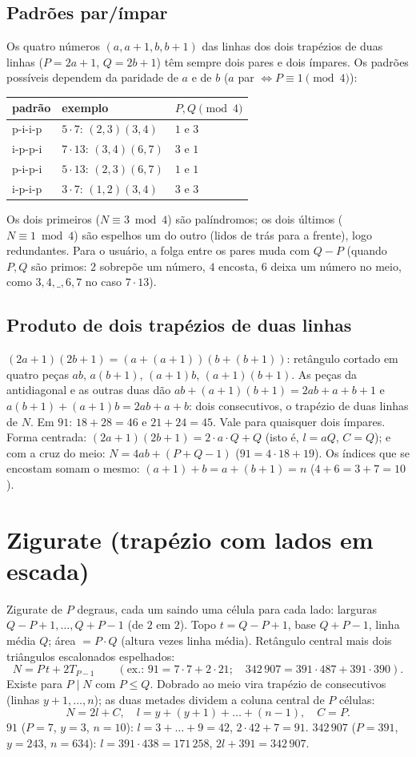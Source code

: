 \documentclass[11pt,a4paper]{article}
\begin{document}
\subsection{Padrões par/ímpar}
Os quatro números $(a,a+1,b,b+1)$ das linhas dos dois trapézios de duas linhas ($P=2a+1$, $Q=2b+1$) têm sempre dois pares e dois ímpares. Os padrões possíveis dependem da paridade de $a$ e de $b$ ($a$ par $\Leftrightarrow P\equiv1 \pmod 4$):
\begin{center}
\begin{tabular}{lll}
\toprule
padrão & exemplo & $P,Q \pmod 4$ \\
\midrule
p-i-i-p & $5\cdot7$: $(2,3)(3,4)$ & $1$ e $3$ \\
i-p-p-i & $7\cdot13$: $(3,4)(6,7)$ & $3$ e $1$ \\
p-i-p-i & $5\cdot13$: $(2,3)(6,7)$ & $1$ e $1$ \\
i-p-i-p & $3\cdot7$: $(1,2)(3,4)$ & $3$ e $3$ \\
\bottomrule
\end{tabular}
\end{center}
Os dois primeiros ($N\equiv3 \bmod 4$) são palíndromos; os dois últimos ($N\equiv1 \bmod 4$) são espelhos um do outro (lidos de trás para a frente), logo redundantes. Para o usuário, a folga entre os pares muda com $Q-P$ (quando $P,Q$ são primos: $2$ sobrepõe um número, $4$ encosta, $6$ deixa um número no meio, como $3,4,\_,6,7$ no caso $7\cdot13$).

\subsection{Produto de dois trapézios de duas linhas}
$(2a+1)(2b+1)=(a+(a+1))(b+(b+1))$: retângulo cortado em quatro peças $ab$, $a(b+1)$, $(a+1)b$, $(a+1)(b+1)$. As peças da antidiagonal e as outras duas dão $ab+(a+1)(b+1)=2ab+a+b+1$ e $a(b+1)+(a+1)b=2ab+a+b$: dois consecutivos, o trapézio de duas linhas de $N$. Em $91$: $18+28=46$ e $21+24=45$. Vale para quaisquer dois ímpares. Forma centrada: $(2a+1)(2b+1)=2\cdot a\cdot Q+Q$ (isto é, $l=aQ$, $C=Q$); e com a cruz do meio: $N=4ab+(P+Q-1)$ ($91=4\cdot18+19$). Os índices que se encostam somam o mesmo: $(a+1)+b=a+(b+1)=n$ ($4+6=3+7=10$).

\section{Zigurate (trapézio com lados em escada)}

Zigurate de $P$ degraus, cada um saindo uma célula para cada lado: larguras $Q-P+1,\dots,Q+P-1$ (de $2$ em $2$). Topo $t=Q-P+1$, base $Q+P-1$, linha média $Q$; área $=P\cdot Q$ (altura vezes linha média). Retângulo central mais dois triângulos escalonados espelhados:
\[
N=P\,t+2T_{P-1}\qquad(\text{ex.: }91=7\cdot7+2\cdot21;\quad 342\,907=391\cdot487+391\cdot390).
\]
Existe para $P\mid N$ com $P\le Q$. Dobrado ao meio vira trapézio de consecutivos (linhas $y+1,\dots,n$); as duas metades dividem a coluna central de $P$ células:
\[
N=2l+C,\quad l=y+(y+1)+\dots+(n-1),\quad C=P .
\]
$91$ ($P=7$, $y=3$, $n=10$): $l=3+\dots+9=42$, $2\cdot42+7=91$. $342\,907$ ($P=391$, $y=243$, $n=634$): $l=391\cdot438=171\,258$, $2l+391=342\,907$.
\end{document}
